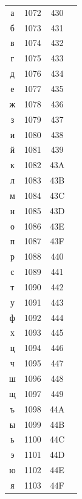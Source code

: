 ﻿\documentclass[10pt]{article}
\begin{document}
\begin{tabular}{crcl}
а&1072&430&\\
б&1073&431&\\
в&1074&432&\\
г&1075&433&\\
д&1076&434&\\
е&1077&435&\\
ж&1078&436&\\
з&1079&437&\\
и&1080&438&\\
й&1081&439&\\
к&1082&43A&\\
л&1083&43B&\\
м&1084&43C&\\
н&1085&43D&\\
о&1086&43E&\\
п&1087&43F&\\
р&1088&440&\\
с&1089&441&\\
т&1090&442&\\
у&1091&443&\\
ф&1092&444&\\
х&1093&445&\\
ц&1094&446&\\
ч&1095&447&\\
ш&1096&448&\\
щ&1097&449&\\
ъ&1098&44A&\\
ы&1099&44B&\\
ь&1100&44C&\\
э&1101&44D&\\
ю&1102&44E&\\
я&1103&44F&\\
\end{tabular}
\end{document}
